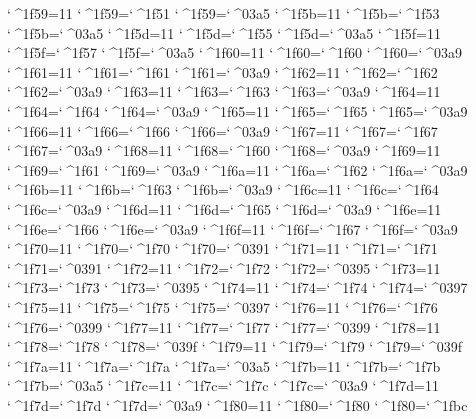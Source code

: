 \catcode`^^^^1f59=11 \lccode`^^^^1f59=`^^^^1f51 \uccode`^^^^1f59=`^^^^03a5 
\catcode`^^^^1f5b=11 \lccode`^^^^1f5b=`^^^^1f53 \uccode`^^^^1f5b=`^^^^03a5 
\catcode`^^^^1f5d=11 \lccode`^^^^1f5d=`^^^^1f55 \uccode`^^^^1f5d=`^^^^03a5 
\catcode`^^^^1f5f=11 \lccode`^^^^1f5f=`^^^^1f57 \uccode`^^^^1f5f=`^^^^03a5 
\catcode`^^^^1f60=11 \lccode`^^^^1f60=`^^^^1f60 \uccode`^^^^1f60=`^^^^03a9 
\catcode`^^^^1f61=11 \lccode`^^^^1f61=`^^^^1f61 \uccode`^^^^1f61=`^^^^03a9 
\catcode`^^^^1f62=11 \lccode`^^^^1f62=`^^^^1f62 \uccode`^^^^1f62=`^^^^03a9 
\catcode`^^^^1f63=11 \lccode`^^^^1f63=`^^^^1f63 \uccode`^^^^1f63=`^^^^03a9 
\catcode`^^^^1f64=11 \lccode`^^^^1f64=`^^^^1f64 \uccode`^^^^1f64=`^^^^03a9 
\catcode`^^^^1f65=11 \lccode`^^^^1f65=`^^^^1f65 \uccode`^^^^1f65=`^^^^03a9 
\catcode`^^^^1f66=11 \lccode`^^^^1f66=`^^^^1f66 \uccode`^^^^1f66=`^^^^03a9 
\catcode`^^^^1f67=11 \lccode`^^^^1f67=`^^^^1f67 \uccode`^^^^1f67=`^^^^03a9 
\catcode`^^^^1f68=11 \lccode`^^^^1f68=`^^^^1f60 \uccode`^^^^1f68=`^^^^03a9 
\catcode`^^^^1f69=11 \lccode`^^^^1f69=`^^^^1f61 \uccode`^^^^1f69=`^^^^03a9 
\catcode`^^^^1f6a=11 \lccode`^^^^1f6a=`^^^^1f62 \uccode`^^^^1f6a=`^^^^03a9 
\catcode`^^^^1f6b=11 \lccode`^^^^1f6b=`^^^^1f63 \uccode`^^^^1f6b=`^^^^03a9 
\catcode`^^^^1f6c=11 \lccode`^^^^1f6c=`^^^^1f64 \uccode`^^^^1f6c=`^^^^03a9 
\catcode`^^^^1f6d=11 \lccode`^^^^1f6d=`^^^^1f65 \uccode`^^^^1f6d=`^^^^03a9 
\catcode`^^^^1f6e=11 \lccode`^^^^1f6e=`^^^^1f66 \uccode`^^^^1f6e=`^^^^03a9 
\catcode`^^^^1f6f=11 \lccode`^^^^1f6f=`^^^^1f67 \uccode`^^^^1f6f=`^^^^03a9 
\catcode`^^^^1f70=11 \lccode`^^^^1f70=`^^^^1f70 \uccode`^^^^1f70=`^^^^0391 
\catcode`^^^^1f71=11 \lccode`^^^^1f71=`^^^^1f71 \uccode`^^^^1f71=`^^^^0391 
\catcode`^^^^1f72=11 \lccode`^^^^1f72=`^^^^1f72 \uccode`^^^^1f72=`^^^^0395 
\catcode`^^^^1f73=11 \lccode`^^^^1f73=`^^^^1f73 \uccode`^^^^1f73=`^^^^0395 
\catcode`^^^^1f74=11 \lccode`^^^^1f74=`^^^^1f74 \uccode`^^^^1f74=`^^^^0397 
\catcode`^^^^1f75=11 \lccode`^^^^1f75=`^^^^1f75 \uccode`^^^^1f75=`^^^^0397 
\catcode`^^^^1f76=11 \lccode`^^^^1f76=`^^^^1f76 \uccode`^^^^1f76=`^^^^0399 
\catcode`^^^^1f77=11 \lccode`^^^^1f77=`^^^^1f77 \uccode`^^^^1f77=`^^^^0399 
\catcode`^^^^1f78=11 \lccode`^^^^1f78=`^^^^1f78 \uccode`^^^^1f78=`^^^^039f 
\catcode`^^^^1f79=11 \lccode`^^^^1f79=`^^^^1f79 \uccode`^^^^1f79=`^^^^039f 
\catcode`^^^^1f7a=11 \lccode`^^^^1f7a=`^^^^1f7a \uccode`^^^^1f7a=`^^^^03a5 
\catcode`^^^^1f7b=11 \lccode`^^^^1f7b=`^^^^1f7b \uccode`^^^^1f7b=`^^^^03a5 
\catcode`^^^^1f7c=11 \lccode`^^^^1f7c=`^^^^1f7c \uccode`^^^^1f7c=`^^^^03a9 
\catcode`^^^^1f7d=11 \lccode`^^^^1f7d=`^^^^1f7d \uccode`^^^^1f7d=`^^^^03a9 
\catcode`^^^^1f80=11 \lccode`^^^^1f80=`^^^^1f80 \uccode`^^^^1f80=`^^^^1fbc 
